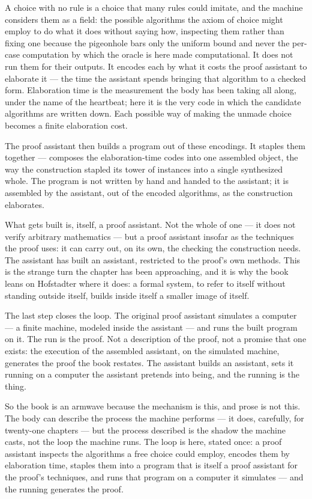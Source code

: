 A choice with no rule is a choice that many rules could imitate, and the machine considers them
as a field: the possible algorithms the axiom of choice might employ to do what it does without
saying how, inspecting them rather than fixing one because the pigeonhole bars only the uniform
bound and never the per-case computation by which the oracle is here made computational. It does not
run them for their outputs. It encodes each by what it costs the proof
assistant to elaborate it --- the time the assistant spends bringing that algorithm to a checked
form. Elaboration time is the measurement the body has been taking all along, under the name of
the heartbeat; here it is the very code in which the candidate algorithms are written down. Each
possible way of making the unmade choice becomes a finite elaboration cost.

The proof assistant then builds a program out of these encodings. It staples them together ---
composes the elaboration-time codes into one assembled object, the way the construction stapled
its tower of instances into a single synthesized whole. The program is not written by hand and
handed to the assistant; it is assembled by the assistant, out of the encoded algorithms, as the
construction elaborates.

What gets built is, itself, a proof assistant. Not the whole of one --- it does not verify
arbitrary mathematics --- but a proof assistant insofar as the techniques the proof uses: it can
carry out, on its own, the checking the construction needs. The assistant has built an assistant,
restricted to the proof's own methods. This is the strange turn the chapter has been approaching,
and it is why the book leans on Hofstadter where it does: a formal system, to refer to itself
without standing outside itself, builds inside itself a smaller image of itself.

The last step closes the loop. The original proof assistant simulates a computer --- a finite
machine, modeled inside the assistant --- and runs the built program on it. The run is the proof.
Not a description of the proof, not a promise that one exists: the execution of the assembled
assistant, on the simulated machine, generates the proof the book restates. The assistant builds
an assistant, sets it running on a computer the assistant pretends into being, and the running is
the thing.

So the book is an armwave because the mechanism is this, and prose is not this. The body can
describe the process the machine performs --- it does, carefully, for twenty-one chapters --- but
the process described is the shadow the machine casts, not the loop the machine runs. The loop is
here, stated once: a proof assistant inspects the algorithms a free choice could employ, encodes
them by elaboration time, staples them into a program that is itself a proof assistant for the
proof's techniques, and runs that program on a computer it simulates --- and the running
generates the proof.

